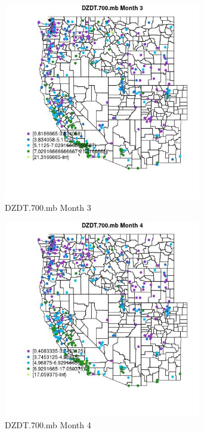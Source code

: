 \begin{figure} 
\centering  
\includegraphics[width=0.77\textwidth]{Code_Outputs/ML_input_report_ML_input_PM25_Step5_part_d_de_duplicated_aves_ML_input_MapObsMo3DZDT700mb.jpg} 
\caption{\label{fig:ML_input_report_ML_input_PM25_Step5_part_d_de_duplicated_aves_ML_inputMapObsMo3DZDT700mb}DZDT.700.mb Month 3} 
\end{figure} 
 

\begin{figure} 
\centering  
\includegraphics[width=0.77\textwidth]{Code_Outputs/ML_input_report_ML_input_PM25_Step5_part_d_de_duplicated_aves_ML_input_MapObsMo4DZDT700mb.jpg} 
\caption{\label{fig:ML_input_report_ML_input_PM25_Step5_part_d_de_duplicated_aves_ML_inputMapObsMo4DZDT700mb}DZDT.700.mb Month 4} 
\end{figure} 
 

